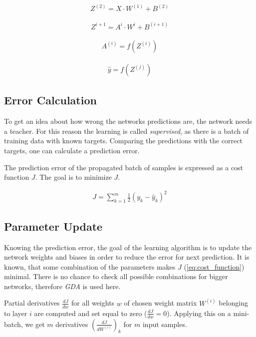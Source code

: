 \begin{align}
Z^{(2)} = X \cdot W^{(1)} + B^{(2)}
\end{align}

\begin{align}
Z^{i+1} = A^i \cdot W^i + B^{(i+1)}
\end{align}

\begin{align}
A^{(i)} = f(Z^{(i)})
\end{align}

\begin{align}
\hat{y} = f(Z^{(j)})
\end{align}

\subsection{Error Calculation} \label{ssec:error_calculation}
To get an idea about how wrong the networks predictions are, the network needs a teacher. For this reason the learning is called \textit{supervised}, as there is a batch of training data with known targets. Comparing the predictions with the correct targets, one can calculate a prediction error. 

The prediction error of the propagated batch of samples is expressed as a cost function $ J $. The goal is to minimize $ J $.

\begin{align} \label{eq:cost_function}
J = \displaystyle{\sum_{k=1}^m} \frac{1}{2}(y_k - \hat{y}_k)^2
\end{align}

\subsection{Parameter Update} \label{ssec:parameter_update}
Knowing the prediction error, the goal of the learning algorithm is to update the network weights and biases in order to reduce the error for next prediction.  It is known, that some combination of the parameters makes $ J $ (\cref{eq:cost_function}) minimal. There is no chance to check all possible combinations for bigger networks, therefore \textit{GDA} is used here.

Partial derivatives $ \frac{dJ}{dw} $ for all weights $ w $ of chosen weight matrix $ W^{(i)} $ belonging to layer $ i $ are computed and set equal to zero ($ \frac{dJ}{dw} = 0 $). Applying this on a mini-batch, we get $ m $ derivatives $ (\frac{dJ}{dW^{(i)}})_k $ for $ m $ input samples. 

